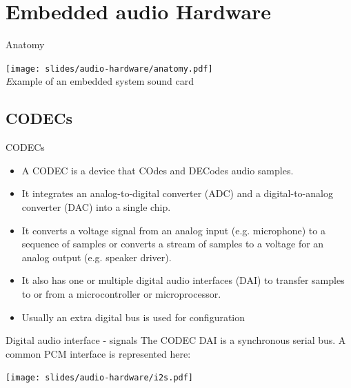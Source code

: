 \section{Embedded audio Hardware}

\begin{frame}{Anatomy}
  \begin{center}
    \texttt{[image: slides/audio-hardware/anatomy.pdf]}\\
    {\textit Example of an embedded system sound card}
  \end{center}
\end{frame}

\subsection{CODECs}

\begin{frame}{CODECs}
  \begin{itemize}
  \item A CODEC is a device that COdes and DECodes audio samples.
  \item It integrates an analog-to-digital converter (ADC) and a
    digital-to-analog converter (DAC) into a single chip.
  \item It converts a voltage signal from an analog input (e.g.
    microphone) to a sequence of samples or converts a stream of
    samples to a voltage for an analog output (e.g. speaker driver).
  \item It also has one or multiple digital audio interfaces (DAI) to
    transfer samples to or from a microcontroller or microprocessor.
  \item Usually an extra digital bus is used for configuration
  \end{itemize}
\end{frame}

\begin{frame}[fragile]{Digital audio interface - signals}
  The CODEC DAI is a synchronous serial bus. A common PCM interface is
  represented here:
  \begin{center}
    \texttt{[image: slides/audio-hardware/i2s.pdf]}\\
  \end{center}
\end{frame}


